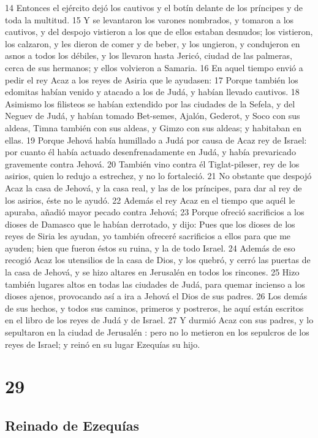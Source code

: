 14 Entonces el ejército dejó los cautivos y el botín delante de los príncipes y de toda la multitud.
15 Y se levantaron los varones nombrados, y tomaron a los cautivos, y del despojo vistieron a los que de ellos estaban desnudos; los vistieron, los calzaron, y les dieron de comer y de beber, y los ungieron, y condujeron en asnos a todos los débiles, y los llevaron hasta Jericó, ciudad de las palmeras, cerca de sus hermanos; y ellos volvieron a Samaria.
16 En aquel tiempo envió a pedir el rey Acaz a los reyes de Asiria que le ayudasen:
17 Porque también los edomitas habían venido y atacado a los de Judá, y habían llevado cautivos.
18 Asimismo los filisteos se habían extendido por las ciudades de la Sefela, y del Neguev de Judá, y habían tomado Bet-semes, Ajalón, Gederot, y Soco con sus aldeas, Timna también con sus aldeas, y Gimzo con sus aldeas; y habitaban en ellas.
19 Porque Jehová había humillado a Judá por causa de Acaz rey de Israel: por cuanto él había actuado desenfrenadamente en Judá, y había prevaricado gravemente contra Jehová.
20 También vino contra él Tiglat-pileser, rey de los asirios, quien lo redujo a estrechez, y no lo fortaleció.
21 No obstante que despojó Acaz la casa de Jehová, y la casa real, y las de los príncipes, para dar al rey de los asirios, éste no le ayudó.
22 Además el rey Acaz en el tiempo que aquél le apuraba, añadió mayor pecado contra Jehová;
23 Porque ofreció sacrificios a los dioses de Damasco que le habían derrotado, y dijo: Pues que los dioses de los reyes de Siria les ayudan, yo también ofreceré sacrificios a ellos para que me ayuden; bien que fueron éstos su ruina, y la de todo Israel. 
24 Además de eso recogió Acaz  los utensilios de la casa de Dios, y los quebró, y cerró las puertas de la casa de Jehová,  y se hizo altares en Jerusalén  en todos los rincones.
25 Hizo también lugares altos en todas las ciudades de Judá, para quemar incienso a los dioses ajenos, provocando así a ira a Jehová el Dios de sus padres.
26 Los demás de sus hechos, y todos sus caminos, primeros y postreros, he aquí están escritos en el libro de los reyes de Judá y de Israel.
27 Y durmió Acaz con sus padres, y lo sepultaron en la ciudad de Jerusalén : pero no lo metieron en los sepulcros de los reyes de Israel; y reinó en su lugar Ezequías su hijo.

\chapter{29}

\section*{Reinado de Ezequías}

